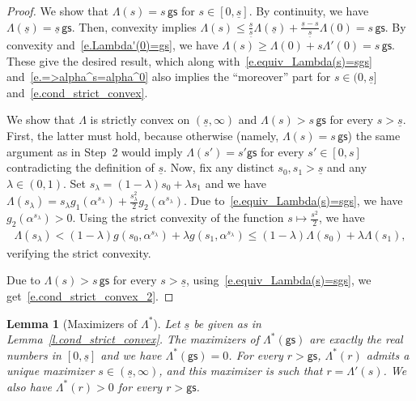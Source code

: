 \documentclass[11pt]{amsart}
\newtheorem{lemma}[proposition]{Lemma}
\theoremstyle{remark}
\theoremstyle{definition}
\numberwithin{equation}{section}
\numberwithin{proposition}{section}
\numberwithin{figure}{section}
\numberwithin{table}{section}
\renewcommand{\leq}{\leqslant}
\renewcommand{\geq}{\geqslant}
\newcommand{\1}{\mathbf{1}}
\newcommand{\msf}{\mathsf}
\newcommand{\gs}{\msf {gs}}
\begin{document}
\begin{proof}
\medskip
{}
We show that $ \Lambda(s)=s \, \gs$ for $s\in [0,\underline s]$. By continuity, we have $ \Lambda(\underline s)=\underline s \, \gs$.
Then, convexity implies $\Lambda(s)\leq \frac{s}{\underline s}\Lambda(\underline s)+ \frac{\underline s -s }{\underline s }\Lambda(0)=s \, \gs$.
By convexity and~\eqref{e.Lambda'(0)=gs}, we have $\Lambda(s)\geq \Lambda(0)+s\Lambda'(0)=s \, \gs$. These give the desired result, which along with~\eqref{e.equiv_Lambda(s)=sgs} and~\eqref{e.=>alpha^s=alpha^0} also implies the ``moreover'' part for $s\in(0,\underline s]$ and~\eqref{e.cond_strict_convex}.


\medskip
{}
We show that $\Lambda$ is strictly convex on $(\underline s ,\infty)$ and $\Lambda(s)> s \, \gs $ for every $s>\underline s$. First, the latter must hold, because otherwise (namely, $\Lambda(s)= s \, \gs$) the same argument as in Step~2 would imply $\Lambda(s') = s'\gs$ for every $s'\in[0,s]$ contradicting the definition of $\underline s$. Now, fix any distinct $s_0,s_1>\underline s$ and any $\lambda\in(0,1)$. Set $s_\lambda = (1-\lambda)s_0+\lambda s_1$ and we have $\Lambda(s_\lambda) = s_\lambda g_1(\alpha^{s_\lambda})+ \frac{s_\lambda^2}{2}g_2(\alpha^{s_\lambda})$. Due to~\eqref{e.equiv_Lambda(s)=sgs}, we have $g_2(\alpha^{s_\lambda})>0$. Using the strict convexity of the function $s\mapsto \frac{s^2}{2}$, we have
\begin{align*}
    \Lambda(s_\lambda)<(1-\lambda)g(s_0,\alpha^{s_\lambda})+\lambda g(s_1,\alpha^{s_\lambda}) \leq (1-\lambda)\Lambda(s_0)+\lambda \Lambda(s_1),
\end{align*}
verifying the strict convexity.

Due to $\Lambda(s)>s \, \gs$ for every $s>\underline s$, using~\eqref{e.equiv_Lambda(s)=sgs}, we get~\eqref{e.cond_strict_convex_2}.
\end{proof}



\begin{lemma}[Maximizers of $\Lambda^*$]\label{l.max_Lambda^*}
Let $\underline s$ be given as in Lemma~\ref{l.cond_strict_convex}.
The maximizers of $\Lambda^*(\gs)$ are exactly the real numbers in $[0,\underline s]$ and we have $\Lambda^*(\gs)=0$.
For every $r>\gs$, $\Lambda^*(r)$ admits a unique maximizer $s\in(\underline s, \infty)$, and this maximizer is such that $r=\Lambda'(s)$. We also have $\Lambda^*(r)>0$ for every $r>\gs$.
\end{lemma}
\end{document}
